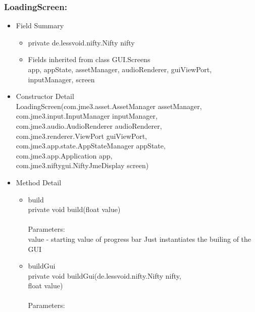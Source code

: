 \documentclass[letterpaper]{article}
\begin{document}
								\subsubsection*{LoadingScreen:}
								\vspace{0.1in}	
									\begin{itemize}
										\item	Field Summary
												\begin{itemize}
													\item	private de.lessvoid.nifty.Nifty	nifty 
													\item	Fields inherited from class GUI.Screens \\
															app, appState, assetManager, audioRenderer, guiViewPort, inputManager, screen
												\end{itemize}
										\item	Constructor Detail \\
												LoadingScreen(com.jme3.asset.AssetManager assetManager, \\
				            com.jme3.input.InputManager inputManager, \\
				            com.jme3.audio.AudioRenderer audioRenderer, \\
				            com.jme3.renderer.ViewPort guiViewPort, \\
				            com.jme3.app.state.AppStateManager appState, \\
				            com.jme3.app.Application app, \\
				            com.jme3.niftygui.NiftyJmeDisplay screen)
										\item	Method Detail
												\begin{itemize}
													\item	build \\
															private void build(float value) \\ \\
															Parameters: \\
															value - starting value of progress bar Just instantiates the builing of the GUI
													\item	buildGui \\
															private void buildGui(de.lessvoid.nifty.Nifty nifty, \\
						            float value) \\ \\
															Parameters: \\

\end{itemize}
\end{itemize}
\end{document}
